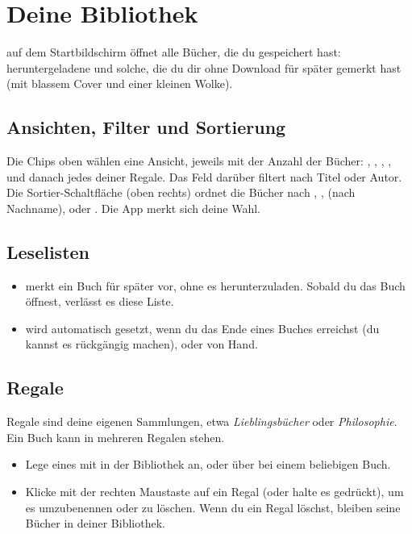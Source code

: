\documentclass[11pt]{article}
\begin{document}
\section{Deine Bibliothek}\label{sec:library}

 auf dem Startbildschirm öffnet alle Bücher, die du gespeichert hast:
heruntergeladene und solche, die du dir ohne Download für später gemerkt hast (mit blassem Cover
und einer kleinen Wolke).


\subsection{Ansichten, Filter und Sortierung}
Die Chips oben wählen eine Ansicht, jeweils mit der Anzahl der Bücher: ,
, , ,  und danach jedes deiner
Regale. Das Feld darüber filtert nach Titel oder Autor. Die Sortier-Schaltfläche (oben rechts)
ordnet die Bücher nach , ,  (nach Nachname),
 oder . Die App merkt sich deine Wahl.

\subsection{Leselisten}
\begin{itemize}
  \item {} merkt ein Buch für später vor, ohne es herunterzuladen. Sobald du
        das Buch öffnest, verlässt es diese Liste.
  \item {} wird automatisch gesetzt, wenn du das Ende eines Buches erreichst (du kannst
        es rückgängig machen), oder von Hand.
\end{itemize}

\subsection{Regale}
Regale sind deine eigenen Sammlungen, etwa \emph{Lieblingsbücher} oder \emph{Philosophie}. Ein
Buch kann in mehreren Regalen stehen.
\begin{itemize}
  \item Lege eines mit  in der Bibliothek an, oder über
         bei einem beliebigen Buch.
  \item Klicke mit der rechten Maustaste auf ein Regal (oder halte es gedrückt), um es
        umzubenennen oder zu löschen. Wenn du ein Regal löschst, bleiben seine Bücher in deiner
        Bibliothek.
\end{itemize}
\end{document}
